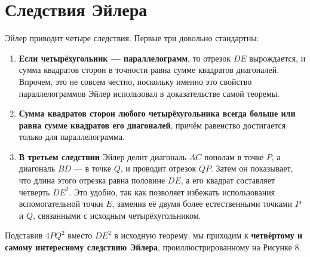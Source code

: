 \section*{Следствия Эйлера}

Эйлер приводит четыре следствия. Первые три довольно стандартны:

\begin{enumerate}
    \item \textbf{Если четырёхугольник — параллелограмм}, то отрезок \( DE \) вырождается, и сумма квадратов сторон в точности равна сумме квадратов диагоналей. Впрочем, это не совсем честно, поскольку именно это свойство параллелограммов Эйлер использовал в доказательстве самой теоремы.

    \item \textbf{Сумма квадратов сторон любого четырёхугольника всегда больше или равна сумме квадратов его диагоналей}, причём равенство достигается только для параллелограмма.

    \item \textbf{В третьем следствии} Эйлер делит диагональ \( AC \) пополам в точке \( P \), а диагональ \( BD \) — в точке \( Q \), и проводит отрезок \( QP \). Затем он показывает, что длина этого отрезка равна половине \( DE \), а его квадрат составляет четверть \( DE^2 \). Это удобно, так как позволяет избежать использования вспомогательной точки \( E \), заменив её двумя более естественными точками \( P \) и \( Q \), связанными с исходным четырёхугольником.
\end{enumerate}

Подставив \( 4PQ^2 \) вместо \( DE^2 \) в исходную теорему, мы приходим к \textbf{четвёртому и самому интересному следствию Эйлера}, проиллюстрированному на Рисунке 8.